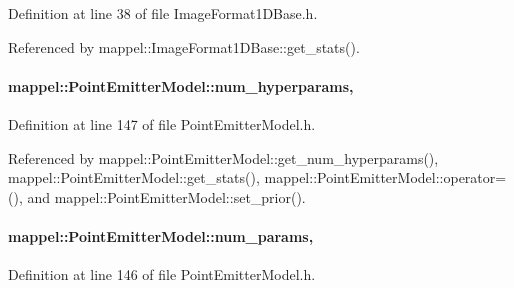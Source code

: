 Definition at line 38 of file Image\+Format1\+D\+Base.\+h.



Referenced by mappel\+::\+Image\+Format1\+D\+Base\+::get\+\_\+stats().

\paragraph[{\texorpdfstring{num\+\_\+hyperparams}{num_hyperparams}}]{ mappel\+::\+Point\+Emitter\+Model\+::num\+\_\+hyperparams\hspace{0.3cm}{\ttfamily [protected]}, {\ttfamily [inherited]}}\hypertarget{classmappel_1_1PointEmitterModel_ab2423214fdd81c8212118770b5b17b1f}{}\label{classmappel_1_1PointEmitterModel_ab2423214fdd81c8212118770b5b17b1f}


Definition at line 147 of file Point\+Emitter\+Model.\+h.



Referenced by mappel\+::\+Point\+Emitter\+Model\+::get\+\_\+num\+\_\+hyperparams(), mappel\+::\+Point\+Emitter\+Model\+::get\+\_\+stats(), mappel\+::\+Point\+Emitter\+Model\+::operator=(), and mappel\+::\+Point\+Emitter\+Model\+::set\+\_\+prior().

\paragraph[{\texorpdfstring{num\+\_\+params}{num_params}}]{ mappel\+::\+Point\+Emitter\+Model\+::num\+\_\+params\hspace{0.3cm}{\ttfamily [protected]}, {\ttfamily [inherited]}}\hypertarget{classmappel_1_1PointEmitterModel_a9af0484391bd6021ddc04ac666ab49ad}{}\label{classmappel_1_1PointEmitterModel_a9af0484391bd6021ddc04ac666ab49ad}


Definition at line 146 of file Point\+Emitter\+Model.\+h.



